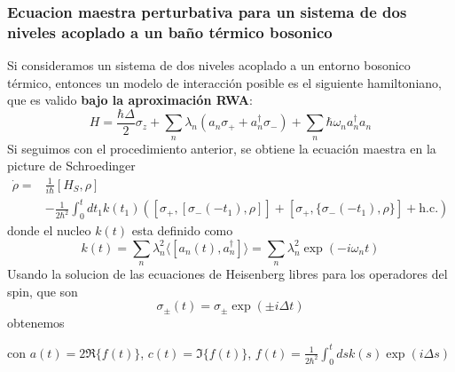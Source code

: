 \subsubsection{Ecuacion maestra perturbativa para un sistema de dos niveles acoplado a un baño térmico bosonico}
Si consideramos un sistema de dos niveles acoplado a un entorno bosonico térmico, entonces un modelo de interacción posible es el siguiente hamiltoniano, que es valido \textbf{bajo la aproximación RWA}:
\begin{equation}
    H=\frac{\hbar\Delta}{2}\sigma_z+\sum_n\lambda_n(a_n\sigma_++a^\dagger_n\sigma_-)+\sum_n\hbar\omega_na^\dagger_na_n
\end{equation}
Si seguimos con el procedimiento anterior, se obtiene la ecuación maestra en la picture de Schroedinger
\begin{equation}
    \begin{split}
        \dot\rho=&\frac{1}{i\hbar}[H_S,\rho] \\ & -\frac{1}{2\hbar^2}\int_0^tdt_1k(t_1)([\sigma_+,[\sigma_-(-t_1),\rho]]+[\sigma_+,\{\sigma_-(-t_1),\rho\}] + \text{h.c.})
    \end{split}
\end{equation}
donde el nucleo $k(t)$ esta definido como
\begin{equation}
    k(t)=\sum_n\lambda_n^2\langle[a_n(t),a_n^\dagger]\rangle=\sum_n\lambda_n^2\exp(-i\omega_nt)
\end{equation}
Usando la solucion de las ecuaciones de Heisenberg libres para los operadores del spin, que son
$$\sigma_\pm(t)=\sigma_\pm\exp(\pm i\Delta t)$$
obtenemos

con $a(t)=2\Re\{f(t)\}$, $c(t)=\Im\{f(t)\}$, $f(t)=\frac{1}{2\hbar^2}\int_0^tdsk(s)\exp(i\Delta s)$

